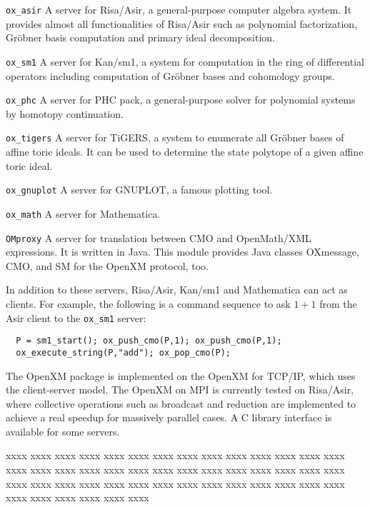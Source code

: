 \begin{description}
\item{\tt ox\_asir}
A server for Risa/Asir, a general-purpose computer algebra
system. It provides almost
all functionalities of Risa/Asir such as polynomial factorization,
Gr\"obner basis computation and primary ideal decomposition.
\item{\tt ox\_sm1}
A server for Kan/sm1, a system for computation in 
the ring of differential operators including computation of Gr\"obner bases
and cohomology groups.
\item {\tt ox\_phc}
A server for PHC pack, a general-purpose solver for
polynomial systems by homotopy continuation. 
\item {\tt ox\_tigers}
A server for TiGERS, a system to enumerate
all Gr\"obner bases of affine toric ideals.
It can be used to determine the state polytope
of a given affine toric ideal.
\item {\tt ox\_gnuplot}
A server for GNUPLOT, a famous plotting tool.
\item {\tt ox\_math}
A server for Mathematica.
\item {\tt OMproxy}
A server for translation between CMO and OpenMath/XML expressions.
It is written in Java.
This module provides Java classes OXmessage, CMO, and SM
for the OpenXM protocol, too.
\end{description}
In addition to these servers, Risa/Asir, Kan/sm1 and Mathematica
can act as clients. 
For example, the following is a command sequence to ask $1+1$ from
the Asir client to the {\tt ox\_sm1} server:
\begin{verbatim}
  P = sm1_start(); ox_push_cmo(P,1); ox_push_cmo(P,1);
  ox_execute_string(P,"add"); ox_pop_cmo(P);
\end{verbatim}
The OpenXM package is implemented on the  OpenXM for TCP/IP, 
which uses the client-server model.
The OpenXM on MPI is currently tested on Risa/Asir,
where collective operations such as broadcast and reduction
are implemented to achieve a real speedup for massively parallel cases.
A C library interface is available for some servers.

xxxx xxxx xxxx xxxx xxxx xxxx xxxx xxxx xxxx xxxx xxxx xxxx
xxxx xxxx xxxx xxxx xxxx xxxx xxxx xxxx xxxx xxxx xxxx xxxx
xxxx xxxx xxxx xxxx xxxx xxxx xxxx xxxx xxxx xxxx xxxx xxxx
xxxx xxxx xxxx xxxx xxxx xxxx xxxx xxxx xxxx xxxx xxxx xxxx




